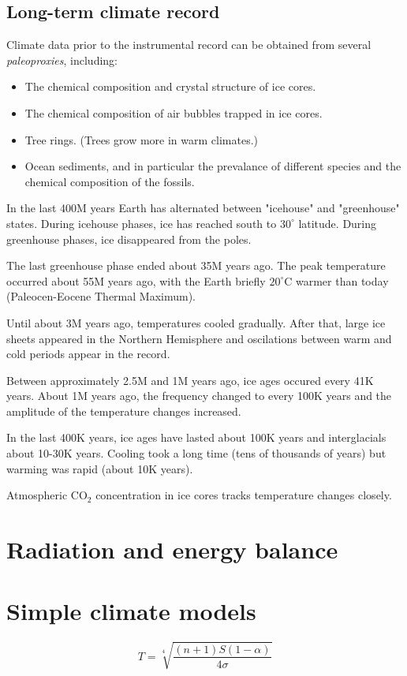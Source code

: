 \documentclass[11pt]{article}
\begin{document}
\subsection{Long-term climate record}

Climate data prior to the instrumental record can be obtained from several {\em paleoproxies}, including:

\begin{itemize}
    \item The chemical composition and crystal structure of ice cores.
    \item The chemical composition of air bubbles trapped in ice cores.
    \item Tree rings. (Trees grow more in warm climates.)
    \item Ocean sediments, and in particular the prevalance of different species and the chemical
        composition of the fossils.
\end{itemize}

In the last 400M years Earth has alternated between "icehouse" and "greenhouse" states.
During icehouse phases, ice has reached south to $30^\circ$ latitude. During greenhouse phases,
ice disappeared from the poles.

The last greenhouse phase ended about 35M years ago. The peak temperature occurred about 55M years ago,
with the Earth briefly $20^\circ$C warmer than today (Paleocen-Eocene Thermal Maximum).

Until about 3M years ago, temperatures cooled gradually. After that, large ice sheets appeared in the
Northern Hemisphere and oscilations between warm and cold periods appear in the record.

Between approximately 2.5M and 1M years ago, ice ages occured every 41K years. About 1M years ago,
the frequency changed to every 100K years and the amplitude of the temperature changes increased.

In the last 400K years, ice ages have lasted about 100K years and interglacials about 10-30K years.
Cooling took a long time (tens of thousands of years) but warming was rapid (about 10K years).

Atmospheric CO$_2$ concentration in ice cores tracks temperature changes closely.

\section{Radiation and energy balance}

\section{Simple climate models}
\[
T = \sqrt[4]{\frac{(n+1)S(1-\alpha)}{4 \sigma}}
\]
\end{document}
